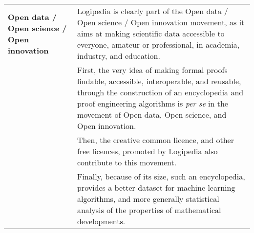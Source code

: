 \begin{longtable}{|p{}|p{}|}
\hline
{\bf Open data / Open science / Open innovation}
&
Logipedia is clearly part of the Open data / Open science / Open
innovation movement, as it aims at making scientific data accessible
to everyone, amateur or professional, in academia, industry, and
education.\\
&
\hspace{0.4cm}
First, the very idea of making formal proofs findable, accessible,
interoperable, and reusable, through the construction of an
encyclopedia and proof engineering algorithms is {\em per se} in the
movement of Open data, Open science, and Open innovation.\\
&
\hspace{0.4cm}
Then, the creative common licence, and other free licences, promoted by 
Logipedia also contribute to this movement.\\
&
\hspace{0.4cm}
Finally, because of its size, such an encyclopedia, provides a better
dataset for machine learning algorithms, and more generally
statistical analysis of the properties of mathematical developments.
\\
\hline
\end{longtable}

